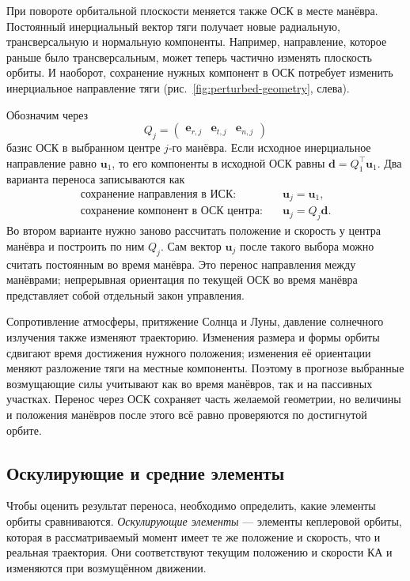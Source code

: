 \documentclass[a4paper,11pt]{article}
\newcommand{\vect}[1]{\boldsymbol{#1}}
\numberwithin{equation}{section}
\begin{document}
При повороте орбитальной плоскости меняется также ОСК
в месте манёвра. Постоянный инерциальный вектор тяги получает
новые радиальную, трансверсальную и нормальную компоненты.
Например, направление, которое раньше было трансверсальным,
может теперь частично изменять плоскость орбиты.
И наоборот, сохранение нужных компонент в ОСК потребует
изменить инерциальное направление тяги
(рис.~\ref{fig:perturbed-geometry}, слева).

Обозначим через
\begin{equation}
Q_j=\begin{pmatrix}\vect e_{r,j}&\vect e_{t,j}&\vect e_{n,j}\end{pmatrix}
\label{eq:transport-basis}
\end{equation}
базис ОСК в выбранном центре $j$-го манёвра.
Если исходное инерциальное направление равно $\vect u_1$,
то его компоненты в исходной ОСК равны $\vect d=Q_1^\top\vect u_1$.
Два варианта переноса записываются как
\begin{equation}
\begin{aligned}
\text{сохранение направления в ИСК:}\quad&\vect u_j=\vect u_1,\\
\text{сохранение компонент в ОСК центра:}\quad&\vect u_j=Q_j\vect d.
\end{aligned}
\label{eq:direction-transport}
\end{equation}
Во втором варианте нужно заново рассчитать положение и скорость
у центра манёвра и построить по ним $Q_j$.
Сам вектор $\vect u_j$ после такого выбора можно считать
постоянным во время манёвра. Это перенос направления
между манёврами; непрерывная ориентация по текущей ОСК
во время манёвра представляет собой отдельный закон управления.

Сопротивление атмосферы, притяжение Солнца и Луны,
давление солнечного излучения также изменяют траекторию.
Изменения размера и формы орбиты сдвигают время достижения
нужного положения; изменения её ориентации меняют
разложение тяги на местные компоненты.
Поэтому в прогнозе выбранные возмущающие силы учитывают
как во время манёвров, так и на пассивных участках.
Перенос через ОСК сохраняет часть желаемой геометрии,
но величины и положения манёвров после этого всё равно
проверяются по достигнутой орбите.

\subsection{Оскулирующие и средние элементы}

Чтобы оценить результат переноса, необходимо определить,
какие элементы орбиты сравниваются.
\textit{Оскулирующие элементы} --- элементы кеплеровой орбиты,
которая в рассматриваемый момент имеет те же положение и скорость,
что и реальная траектория. Они соответствуют текущим положению и скорости КА
и изменяются при возмущённом движении.
\end{document}
